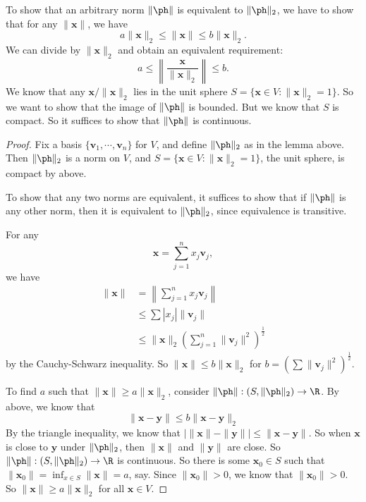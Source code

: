\documentclass[a4paper]{article}
\begin{document}
To show that an arbitrary norm $\|\ph\|$ is equivalent to $\|\ph\|_2$, we have to show that for any $\|\mathbf{x}\|$, we have
\[
  a \|\mathbf{x}\|_2 \leq \|\mathbf{x}\| \leq b\|\mathbf{x}\|_2.
\]
We can divide by $\|\mathbf{x}\|_2$ and obtain an equivalent requirement:
\[
  a \leq \left\|\frac{\mathbf{x}}{\|\mathbf{x}\|_2}\right\| \leq b.
\]
We know that any $\mathbf{x}/\|\mathbf{x}\|_2$ lies in the unit sphere $S = \{\mathbf{x} \in V: \|\mathbf{x}\|_2 = 1\}$. So we want to show that the image of $\|\ph\|$ is bounded. But we know that $S$ is compact. So it suffices to show that $\|\ph\|$ is continuous.
\begin{proof}
  Fix a basis $\{\mathbf{v}_1, \cdots, \mathbf{v}_n\}$ for $V$, and define $\|\ph\|_2$ as in the lemma above. Then $\|\ph\|_2$ is a norm on $V$, and $S = \{\mathbf{x} \in V: \|\mathbf{x}\|_2 = 1\}$, the unit sphere, is compact by above.

  To show that any two norms are equivalent, it suffices to show that if $\|\ph\|$ is any other norm, then it is equivalent to $\|\ph\|_2$, since equivalence is transitive.

  For any
  \[
    \mathbf{x} = \sum_{j = 1}^n x_j \mathbf{v}_j,
  \]
  we have
  \begin{align*}
    \|\mathbf{x}\| &= \left\|\sum_{j = 1}^n x_j \mathbf{v}_j\right\|\\
    &\leq \sum |x_j| \|\mathbf{v}_j\|\\
    &\leq \|\mathbf{x}\|_2 \left(\sum_{j = 1}^n \|\mathbf{v}_j\|^2\right)^{\frac{1}{2}}
  \end{align*}
  by the Cauchy-Schwarz inequality. So $\|\mathbf{x}\| \leq b\|\mathbf{x}\|_2$ for $b = \left(\sum \|\mathbf{v}_j\|^2\right)^{\frac{1}{2}}$.

  To find $a$ such that $\|\mathbf{x}\| \geq a\|\mathbf{x}\|_2$, consider $\|\ph\|: (S, \|\ph\|_2)\to \R$. By above, we know that
  \[
    \|\mathbf{x} - \mathbf{y}\| \leq b \|\mathbf{x} - \mathbf{y}\|_2
  \]
  By the triangle inequality, we know that $\big|\|\mathbf{x}\| - \|\mathbf{y}\|\big| \leq \|\mathbf{x} - \mathbf{y}\|$. So when $\mathbf{x}$ is close to $\mathbf{y}$ under $\|\ph\|_2$, then $\|\mathbf{x}\|$ and $\|\mathbf{y}\|$ are close. So $\|\ph\|: (S, \|\ph\|_2) \to \R$ is continuous. So there is some $\mathbf{x}_0 \in S$ such that $\|\mathbf{x}_0\| = \inf_{x \in S} \|\mathbf{x}\| = a$, say. Since $\|\mathbf{x}_0\| > 0$, we know that $\|\mathbf{x}_0\| > 0$. So $\|\mathbf{x}\| \geq a\|\mathbf{x}\|_2$ for all $\mathbf{x}\in V$.
\end{proof}
\end{document}
